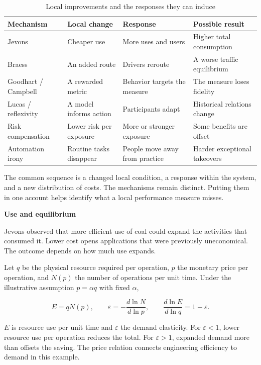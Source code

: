 \documentclass[11pt,openany]{book}
\newcommand{\subhead}[1]{\par\medskip\noindent\textbf{#1}\par\nobreak\smallskip}
\begin{document}
\begin{table}[ht]
\centering
\caption{Local improvements and the responses they can induce}
\label{tab:ch1-paradox}
{\small
\begin{tabularx}{\textwidth}{@{}p{2.25cm}YYY@{}}
\toprule
Mechanism & Local change & Response & Possible result\\
\midrule
Jevons & Cheaper use & More uses and users & Higher total consumption\\
Braess & An added route & Drivers reroute & A worse traffic equilibrium\\
Goodhart / Campbell & A rewarded metric & Behavior targets the measure & The measure loses fidelity\\
Lucas / reflexivity & A model informs action & Participants adapt & Historical relations change\\
Risk compensation & Lower risk per exposure & More or stronger exposure & Some benefits are offset\\
Automation irony & Routine tasks disappear & People move away from practice & Harder exceptional takeovers\\
\bottomrule
\end{tabularx}}
\end{table}

The common sequence is a changed local condition, a response within the system, and a new distribution of costs. The mechanisms remain distinct. Putting them in one account helps identify what a local performance measure misses.

\subhead{Use and equilibrium}

Jevons observed that more efficient use of coal could expand the activities that consumed it.\cite{jevons1865coal,allwood2012sustainable} Lower cost opens applications that were previously uneconomical. The outcome depends on how much use expands.

Let $q$ be the physical resource required per operation, $p$ the monetary price per operation, and $N(p)$ the number of operations per unit time. Under the illustrative assumption $p=\alpha q$ with fixed $\alpha$,

\begin{equation}
E=qN(p),
\qquad
\varepsilon=-\frac{d\ln N}{d\ln p},
\qquad
\frac{d\ln E}{d\ln q}=1-\varepsilon.
\end{equation}

$E$ is resource use per unit time and $\varepsilon$ the demand elasticity. For $\varepsilon<1$, lower resource use per operation reduces the total. For $\varepsilon>1$, expanded demand more than offsets the saving. The price relation connects engineering efficiency to demand in this example.
\end{document}
